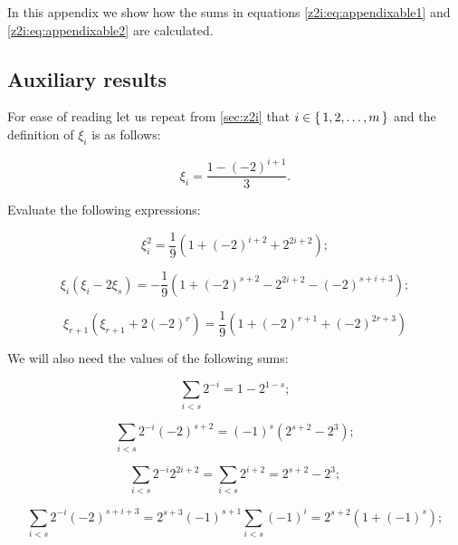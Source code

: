 In this appendix we show how the sums in equations \eqref{z2i:eq:appendixable1} and 
\eqref{z2i:eq:appendixable2} are calculated.

\subsection{Auxiliary results}

For ease of reading let us repeat from \ref{sec:z2i} that 
$i\in \set{1,2,\ldots,m}$ and the definition of $\xi_i$ is as follows:

\begin{equation}
	\xi_i = \frac{1-(-2)^{i+1}} 3.
\end{equation}

Evaluate the following expressions:

\begin{equation}
	\label{appendix:eq:xi1}
	\xi_i^2
	 = \frac 1 9 \left(
		1 + (-2)^{i+2} + 2^{2i+2}
	 \right);
\end{equation}

\begin{equation}
	\label{appendix:eq:xi2}
	\xi_i (\xi_i - 2 \xi_s)
	 = -\frac 1 9 \left(
		1 + (-2)^{s+2} - 2^{2i+2} - (-2)^{s+i+3}
	 \right);
\end{equation}

\begin{equation}
	\label{appendix:eq:xi3}
	\xi_{r+1} (\xi_{r+1} + 2(-2)^r)
	= \frac 1 9 \left(
		1 + (-2)^{r+1} + (-2)^{2r+3}
	\right)
\end{equation}

We will also need the values of the following sums:

\begin{equation}
	\label{appendix:eq:sum1}
	\sum\limits_{i<s} 2^{-i} = 1 - 2^{1-s};
\end{equation}

\begin{equation}
	\label{appendix:eq:sum2}
	\sum\limits_{i<s}  2^{-i} (-2)^{s+2}
	= (-1)^s (2^{s+2} - 2^3);
\end{equation}

\begin{equation}
	\label{appendix:eq:sum3}
	\sum\limits_{i<s} 2^{-i} 2^{2i+2}
	= \sum\limits_{i<s} 2^{i+2}
	= 2^{s+2} - 2^3;
\end{equation}

\begin{equation}
	\label{appendix:eq:sum4}
	\sum\limits_{i<s} 2^{-i} (-2)^{s+i+3}
	= 2^{s+3} (-1)^{s+1} \sum\limits_{i<s} (-1)^i
	= 2^{s+2} (1+(-1)^s);
\end{equation}

